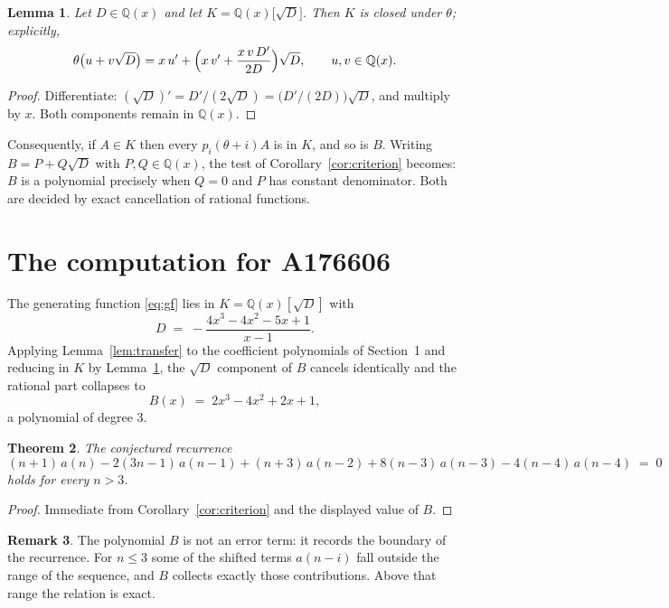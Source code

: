 \documentclass[11pt,a4paper]{article}
\theoremstyle{plain}
\newtheorem{theorem}{Theorem}
\newtheorem{lemma}[theorem]{Lemma}
\theoremstyle{definition}
\newtheorem{remark}[theorem]{Remark}
\begin{document}
\begin{lemma}\label{lem:field}
Let $D\in\mathbb{Q}(x)$ and let $K=\mathbb{Q}(x)\bigl[\sqrt{D}\bigr]$. Then $K$ is closed
under $\theta$; explicitly,
\[
\theta\bigl(u+v\sqrt{D}\bigr)=x\,u'+\Bigl(x\,v'+\frac{x\,v\,D'}{2D}\Bigr)\sqrt{D},
\qquad u,v\in\mathbb{Q}(x).
\]
\end{lemma}

\begin{proof}
Differentiate: $(\sqrt{D})'=D'/(2\sqrt{D})=\bigl(D'/(2D)\bigr)\sqrt{D}$, and multiply by
$x$. Both components remain in $\mathbb{Q}(x)$.
\end{proof}

Consequently, if $A\in K$ then every $p_{i}(\theta+i)A$ is in $K$, and so is $B$. Writing
$B=P+Q\sqrt{D}$ with $P,Q\in\mathbb{Q}(x)$, the test of Corollary~\ref{cor:criterion}
becomes: $B$ is a polynomial precisely when $Q=0$ and $P$ has constant denominator. Both
are decided by exact cancellation of rational functions.

\section{The computation for A176606}

The generating function \eqref{eq:gf} lies in $K=\mathbb{Q}(x)[\sqrt{D}]$ with
\[
D \;=\; - \frac{4 x^{3} - 4 x^{2} - 5 x + 1}{x - 1} .
\]
Applying Lemma~\ref{lem:transfer} to the coefficient polynomials of Section~1 and reducing
in $K$ by Lemma~\ref{lem:field}, the $\sqrt{D}$ component of $B$ cancels identically and
the rational part collapses to
\[
B(x)\;=\;2 x^{3} - 4 x^{2} + 2 x + 1 ,
\]
a polynomial of degree $3$.

\begin{theorem}
The conjectured recurrence
\[
(n + 1)\,a(n) -  2 \left(3 n - 1\right)\,a(n-1) + (n + 3)\,a(n-2) + 8 \left(n - 3\right)\,a(n-3) -  4 \left(n - 4\right)\,a(n-4) \;=\;0
\]
holds for every $n>3$.
\end{theorem}

\begin{proof}
Immediate from Corollary~\ref{cor:criterion} and the displayed value of $B$.
\end{proof}

\begin{remark}
The polynomial $B$ is not an error term: it records the boundary of the recurrence. For
$n\le3$ some of the shifted terms $a(n-i)$ fall outside the range of the sequence,
and $B$ collects exactly those contributions. Above that range the relation is exact.
\end{remark}
\end{document}

